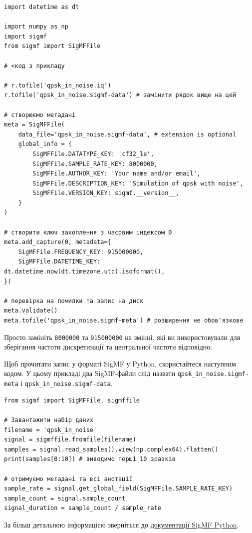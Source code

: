 \begin{Verbatim}[breaklines=true,breakanywhere=true,fontsize=\small]
import datetime as dt

import numpy as np
import sigmf
from sigmf import SigMFFile

# <код з прикладу

# r.tofile('qpsk_in_noise.iq')
r.tofile('qpsk_in_noise.sigmf-data') # замінити рядок вище на цей

# створюємо метадані
meta = SigMFFile(
    data_file='qpsk_in_noise.sigmf-data', # extension is optional
    global_info = {
        SigMFFile.DATATYPE_KEY: 'cf32_le',
        SigMFFile.SAMPLE_RATE_KEY: 8000000,
        SigMFFile.AUTHOR_KEY: 'Your name and/or email',
        SigMFFile.DESCRIPTION_KEY: 'Simulation of qpsk with noise',
        SigMFFile.VERSION_KEY: sigmf.__version__,
    }
)

# створити ключ захоплення з часовим індексом 0
meta.add_capture(0, metadata={
    SigMFFile.FREQUENCY_KEY: 915000000,
    SigMFFile.DATETIME_KEY: dt.datetime.now(dt.timezone.utc).isoformat(),
})

# перевірка на помилки та запис на диск
meta.validate()
meta.tofile('qpsk_in_noise.sigmf-meta') # розширення не обов'язкове
\end{Verbatim}

Просто замініть \texttt{8000000} та \texttt{915000000} на змінні, які ви
використовували для зберігання частоти дискретизації та центральної
частоти відповідно.

Щоб прочитати запис у форматі SigMF у Python, скористайтеся наступним
кодом. У цьому прикладі два SigMF-файли слід назвати
\texttt{qpsk\_in\_noise.sigmf-meta} і
\texttt{qpsk\_in\_noise.sigmf-data}.

\begin{Verbatim}[breaklines=true,breakanywhere=true,fontsize=\small]
from sigmf import SigMFFile, sigmffile

# Завантажити набір даних
filename = 'qpsk_in_noise'
signal = sigmffile.fromfile(filename)
samples = signal.read_samples().view(np.complex64).flatten()
print(samples[0:10]) # виводимо перші 10 зразків

# отримуємо метадані та всі анотації
sample_rate = signal.get_global_field(SigMFFile.SAMPLE_RATE_KEY)
sample_count = signal.sample_count
signal_duration = sample_count / sample_rate
\end{Verbatim}

За більш детальною інформацією зверніться до
\href{https://github.com/sigmf/sigmf-python}{документації SigMF Python}.

